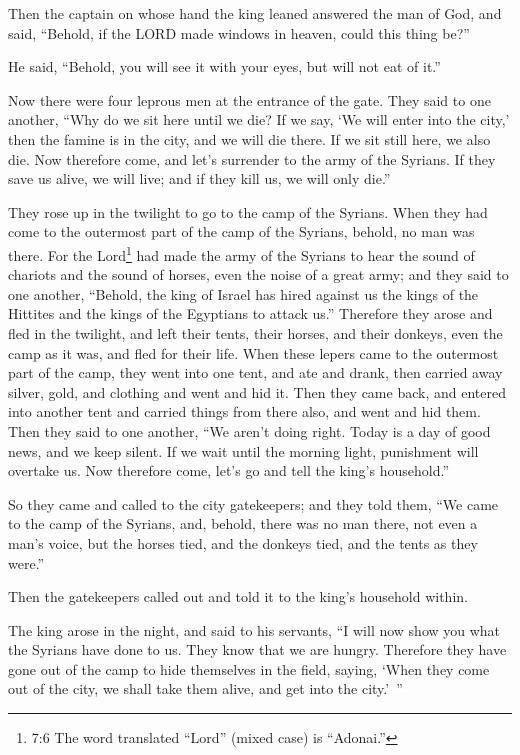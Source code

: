 \myverse{}Then the captain on whose hand the king leaned answered the man
of God, and said, “Behold, if the LORD made windows in heaven, could this thing be?”

He said, “Behold, you will see it with your eyes, but will not eat of it.”

\myverse{}Now there were four leprous men at the entrance of the gate. They
said to one another, “Why do we sit here until we die?
\myverse{}If we say, ‘We will enter into the city,’ then the famine is in the city, and
we will die there. If we sit still here, we also die. Now therefore come, and let’s surrender to the army
of the Syrians. If they save us alive, we will live; and if they kill us, we will only die.”

\myverse{}They rose up in the twilight to go to the camp of the Syrians.
When they had come to the outermost part of the camp of the Syrians, behold, no man was there.
\myverse{}For the Lord\footnote{7:6 The word translated “Lord” (mixed case) is “Adonai.”} had made the army of the Syrians
to hear the sound of chariots and the sound of horses, even the noise of a great army; and they said to
one another, “Behold, the king of Israel has hired against us the kings of the Hittites and the kings
of the Egyptians to attack us.”
\myverse{}Therefore they arose and fled in the twilight, and left their tents, their horses,
and their donkeys, even the camp as it was, and fled for their life.
\myverse{}When these lepers came to the outermost part of the camp, they went into one
tent, and ate and drank, then carried away silver, gold, and clothing and went and hid it. Then they came
back, and entered into another tent and carried things from there also, and went and hid them.
\myverse{}Then they said to one another, “We aren’t doing right. Today is a day of good
news, and we keep silent. If we wait until the morning light, punishment will overtake us. Now therefore
come, let’s go and tell the king’s household.”

\myverse{}So they came and called to the city gatekeepers; and they told
them, “We came to the camp of the Syrians, and, behold, there was no man there, not even a man’s voice,
but the horses tied, and the donkeys tied, and the tents as they were.”

\myverse{}Then the gatekeepers called out and told it to the king’s household
within.

\myverse{}The king arose in the night, and said to his servants, “I will
now show you what the Syrians have done to us. They know that we are hungry. Therefore they have gone
out of the camp to hide themselves in the field, saying, ‘When they come out of the city, we shall take
them alive, and get into the city.’ ”

